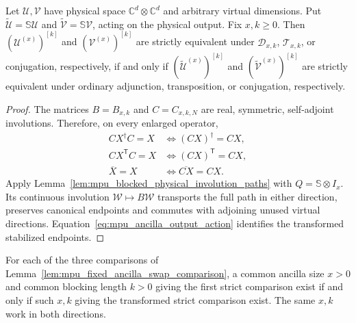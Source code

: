 \begin{lemma}
    \label{lem:mpu_fixed_ancilla_swap_comparison}
    \leanok
    Let $\mathcal U,\mathcal V$ have physical space
    $\mathbb C^d\otimes\mathbb C^d$ and arbitrary virtual dimensions.
    Put $\widetilde{\mathcal U}=\mathbb S\mathcal U$ and
    $\widetilde{\mathcal V}=\mathbb S\mathcal V$, acting on the physical
    output. Fix $x,k\geq0$. Then
    $(\mathcal U^{(x)})^{[k]}$ and $(\mathcal V^{(x)})^{[k]}$ are strictly
    equivalent under $\mathcal D_{x,k}$, $\mathcal T_{x,k}$, or conjugation,
    respectively, if and only if
    $(\widetilde{\mathcal U}^{(x)})^{[k]}$ and
    $(\widetilde{\mathcal V}^{(x)})^{[k]}$ are strictly equivalent under
    ordinary adjunction, transposition, or conjugation, respectively.
\end{lemma}

\begin{proof}\leanok
    The matrices $B=B_{x,k}$ and $C=C_{x,k,N}$ are real, symmetric,
    self-adjoint involutions. Therefore, on every enlarged operator,
    \begin{align}
        CX^\dagger C=X    & \iff(CX)^\dagger=CX,     \\
        CX^{\mathsf T}C=X & \iff(CX)^{\mathsf T}=CX, \\
        \overline X=X     & \iff\overline{CX}=CX.
    \end{align}
    Apply Lemma~\ref{lem:mpu_blocked_physical_involution_paths} with
    $Q=\mathbb S\otimes I_x$. Its continuous involution
    $\mathcal W\mapsto B\mathcal W$ transports the full path in either
    direction, preserves canonical endpoints and commutes with adjoining
    unused virtual directions. Equation~\ref{eq:mpu_ancilla_output_action}
    identifies the transformed stabilized endpoints.
\end{proof}

\begin{lemma}
    \label{lem:mpu_common_ancilla_swap_comparison}
    \leanok
    For each of the three comparisons of
    Lemma~\ref{lem:mpu_fixed_ancilla_swap_comparison}, a common ancilla
    size $x>0$ and common blocking length $k>0$ giving the first strict
    comparison exist if and only if such $x,k$ giving the transformed
    strict comparison exist. The same $x,k$ work in both directions.
\end{lemma}

